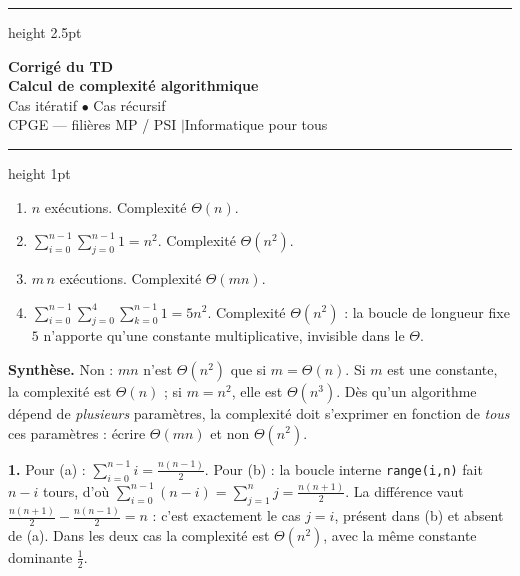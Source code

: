 \documentclass[11pt,a4paper]{article}
\begin{document}
\begin{center}
  {\color{teal}\hrule height 2.5pt}
  \vspace{10pt}
  {\Huge\bfseries\color{teal} Corrigé du TD}\\[6pt]
  {\LARGE\bfseries Calcul de complexité algorithmique}\\[10pt]
  {\large Cas itératif \;$\bullet$\; Cas récursif}\\[8pt]
  {\normalsize CPGE --- filières MP / PSI \quad$|$\quad Informatique pour tous}\\[6pt]
  \vspace{6pt}
  {\color{teal}\hrule height 1pt}
\end{center}

\vspace{8pt}


\reponse
\begin{enumerate}[label=(\alph*),leftmargin=*]
  \item $n$ exécutions. Complexité $\Theta(n)$.
  \item $\displaystyle\sum_{i=0}^{n-1}\sum_{j=0}^{n-1}1 = n^2$. Complexité $\Theta(n^2)$.
  \item $m\,n$ exécutions. Complexité $\Theta(mn)$.
  \item $\displaystyle\sum_{i=0}^{n-1}\sum_{j=0}^{4}\sum_{k=0}^{n-1}1 = 5n^2$.
        Complexité $\Theta(n^2)$ : la boucle de longueur fixe $5$ n'apporte qu'une
        constante multiplicative, invisible dans le $\Theta$.
\end{enumerate}

\textbf{Synthèse.} Non : $mn$ n'est $\Theta(n^2)$ que si $m=\Theta(n)$.
Si $m$ est une constante, la complexité est $\Theta(n)$ ; si $m=n^2$, elle est
$\Theta(n^3)$. Dès qu'un algorithme dépend de \emph{plusieurs} paramètres, la complexité
doit s'exprimer en fonction de \emph{tous} ces paramètres : écrire $\Theta(mn)$ et non
$\Theta(n^2)$.

\reponse
\textbf{1.} Pour (a) : $\displaystyle\sum_{i=0}^{n-1} i = \frac{n(n-1)}{2}$.
Pour (b) : la boucle interne \texttt{range(i,n)} fait $n-i$ tours, d'où
$\displaystyle\sum_{i=0}^{n-1}(n-i) = \sum_{j=1}^{n} j = \frac{n(n+1)}{2}$.
La différence vaut $\frac{n(n+1)}{2}-\frac{n(n-1)}{2}= n$ : c'est exactement le cas
$j=i$, présent dans (b) et absent de (a). Dans les deux cas la complexité est
$\Theta(n^2)$, avec la même constante dominante $\tfrac12$.
\end{document}
